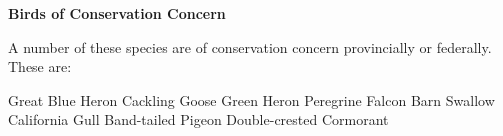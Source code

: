 \textbf{Birds of Conservation Concern}

A number of these species are of conservation concern \mbox{provincially} or
\mbox{federally}. These are:

Great Blue Heron\newline
Cackling Goose\newline
Green Heron\newline
Peregrine Falcon\newline
Barn Swallow\newline
California Gull\newline
Band-tailed Pigeon\newline
Double-crested Cormorant\newline


